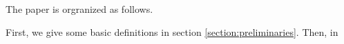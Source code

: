 The paper is orgranized as follows.

First, we give some basic definitions in section \ref{section:preliminaries}. Then, in  











